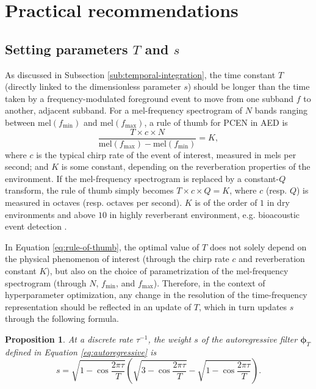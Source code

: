 \documentclass[journal]{IEEEtran}
\makeatletter
\newcommand*{\eg}{e.g.\@\xspace}
\newcommand*{\resp}{resp.\@\xspace}
\newtheorem{prop}[thm]{Proposition}
\theoremstyle{remark}
\makeatother
\begin{document}
\section{Practical recommendations\label{sec:practical-recommendations}}


\subsection{Setting parameters $T$ and $s$}

As discussed in Subsection \ref{sub:temporal-integration}, the time constant $T$ (directly linked to the dimensionless parameter $s$) should be longer than the time taken by a frequency-modulated foreground event to move from one subband $f$ to another, adjacent subband.
For a mel-frequency spectrogram of $N$ bands ranging between $\mathrm{mel}(f_{\min})$ and $\mathrm{mel}(f_{\max})$, a rule of thumb for PCEN in AED is
\begin{equation}
\dfrac{T\times c \times N}{\mathrm{mel}(f_{\max}) - \mathrm{mel}(f_{\min})} = K,
\label{eq:rule-of-thumb}
\end{equation}
where $c$ is the typical chirp rate of the event of interest, measured in mels per second; and $K$ is some constant, depending on the reverberation properties of the environment.
If the mel-frequency spectrogram is replaced by a constant-$Q$ transform, the rule of thumb simply becomes $T \times c \times Q = K$,
where $c$ (\resp{} $Q$) is measured in octaves (\resp{} octaves per second).
$K$ is of the order of $1$ in  dry environments 
and above $10$ in highly reverberant environment, \eg{} bioacoustic event detection \cite{salamon2016plos,shonfield2017ace}.

In Equation \ref{eq:rule-of-thumb}, the optimal value of $T$ does not solely depend on the physical phenomenon of interest (through the chirp rate $c$ and reverberation constant $K$), but also on the choice of parametrization of the mel-frequency spectrogram (through $N$, $f_\mathrm{\min}$, and $f_\mathrm{\max}$).
Therefore,
in the context of hyperparameter optimization,
any change in the resolution of the time-frequency representation
should be reflected in an update of $T$, which in turn updates $s$ through the following formula.
\begin{prop}
\label{prop:T-to-s}
At a discrete rate $\tau^{-1}$, the weight $s$ of the autoregressive filter $\boldsymbol{\phi}_T$ defined in Equation \ref{eq:autoregressive} is
\begin{equation}
s = \sqrt{1 - \cos \dfrac{2\pi \tau}{T}} \left(\sqrt{3 - \cos \dfrac{2\pi \tau}{T}} - \sqrt{1 - \cos \dfrac{2\pi \tau}{T}}  \right).
\end{equation}
\end{prop}
\end{document}
